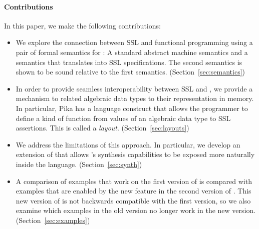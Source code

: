 \paragraph{Contributions} In this paper, we make the following contributions:
\begin{itemize}
  \item We explore the connection between SSL and functional programming using a pair of formal semantics for \Pika: A standard abstract machine semantics and a
    semantics that translates \Pika{} into SSL specifications. The second semantics is shown to be sound relative to the first semantics. (Section~\ref{sec:semantics})

  \item In order to provide seamless interoperability between SSL and \Pika, we provide a mechanism to related algebraic data types to their representation in memory. In particular, Pika has a language construct that allows the programmer to define a kind of function from values of an algebraic data type to SSL assertions. This is called a \textit{layout}. (Section~\ref{sec:layouts})

  \item We address the limitations of this approach. In particular, we develop an extension of \Pika{} that allows \SuSLik's synthesis capabilities to be exposed more naturally inside the \Pika{} language. (Section~\ref{sec:synth})

  \item A comparison of examples that work on the first version of \Pika{} is compared with examples that are enabled by the new feature in the second version of \Pika. This new version of \Pika{} is not backwards compatible with the first version, so we also examine which examples in the old version no longer work in the new version. (Section~\ref{sec:examples})
\end{itemize}


